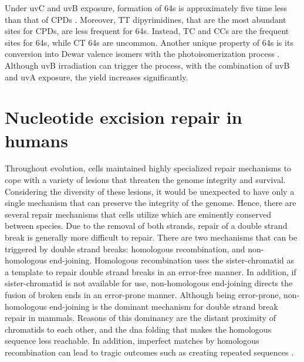 Under \gls{uv}C and \gls{uv}B exposure, formation of \gls{64}s is approximately five time less than that of \gls{CPD}s \citep{douki2001individual}. Moreover, \gls{T}\gls{T} dipyrimidines, that are the most abundant sites for \gls{CPD}s, are less frequent for \gls{64}s. Instead, \gls{T}\gls{C} and \gls{C}\gls{C}s are the frequent sites for \gls{64}s, while \gls{C}\gls{T} \gls{64}s are uncommon. Another unique property of \gls{64}s is its conversion into Dewar valence isomers with the photoisomerization process \citep{taylor1987dna}. Although \gls{uv}B irradiation can trigger the process, with the combination of \gls{uv}B and \gls{uv}A exposure, the yield increases significantly.

\section{Nucleotide excision repair in humans}

Throughout evolution, cells maintained highly specialized repair mechanisms to cope with a variety of lesions that threaten the genome integrity and survival. Considering the diversity of these lesions, it would be unexpected to have only a single mechanism that can preserve the integrity of the genome. Hence, there are several repair mechanisms that cells utilize which are eminently conserved between species. Due to the removal of both strands, repair of a double strand break is generally more difficult to repair. There are two mechanisms that can be triggered by double strand breaks: homologous recombination, and non-homologous end-joining. Homologous recombination uses the sister-chromatid as a template to repair double strand breaks in an error-free manner. In addition, if sister-chromatid is not available for use, non-homologous end-joining directs the fusion of broken ends in an error-prone manner. Although being error-prone, non-homologous end-joining is the dominant mechanism for double strand break repair in mammals. Reasons of this dominancy are the distant proximity of chromatids to each other, and the \gls{dna} folding that makes the homologous sequence less reachable. In addition, imperfect matches by homologous recombination can lead to tragic outcomes such as creating repeated sequences \citep{li2018mismatch}.

